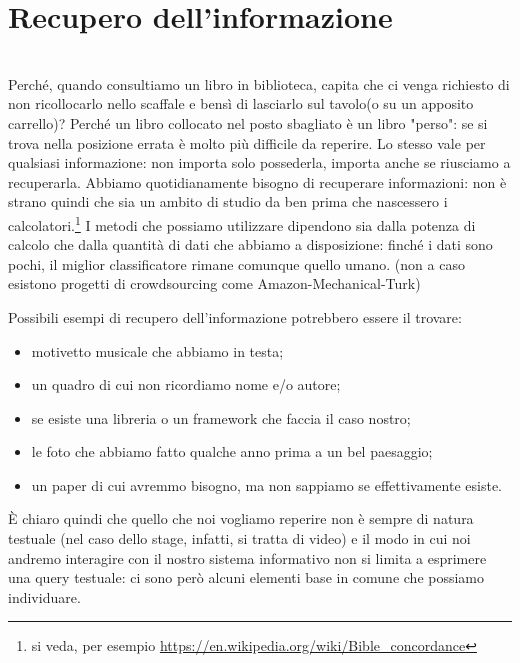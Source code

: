 \chapter{Recupero dell'informazione}
\label{cap:recupero-informazione}
\\

Perché, quando consultiamo un libro in biblioteca, capita che ci venga richiesto di non ricollocarlo nello scaffale e bensì di lasciarlo sul tavolo(o su un apposito carrello)? Perché un libro collocato nel posto sbagliato è un libro "perso": se si trova nella posizione errata è molto più difficile da reperire. Lo stesso vale per qualsiasi informazione: non importa solo possederla, importa anche se riusciamo a recuperarla.
Abbiamo quotidianamente bisogno di recuperare informazioni: non è strano quindi che sia un ambito di studio da ben prima che nascessero i calcolatori.\footnote{si veda, per esempio \url{https://en.wikipedia.org/wiki/Bible_concordance}} I metodi che possiamo utilizzare dipendono sia dalla potenza di calcolo che dalla quantità di dati che abbiamo a disposizione: finché i dati sono pochi, il miglior classificatore rimane comunque quello umano. (non a caso esistono progetti di crowdsourcing come \gls{Amazon-Mechanical-Turk}\glsfirstoccur{})

Possibili esempi di recupero dell'informazione potrebbero essere il trovare: 
\begin{itemize}
\item motivetto musicale che abbiamo in testa;
\item un quadro di cui non ricordiamo nome e/o autore;
\item se esiste una libreria o un framework che faccia il caso nostro;
\item le foto che abbiamo fatto qualche anno prima a un bel paesaggio;
\item un paper di cui avremmo bisogno, ma non sappiamo se effettivamente esiste.
\end{itemize}

È chiaro quindi che quello che noi vogliamo reperire non è sempre di natura testuale (nel caso dello stage, infatti, si tratta di video) e il modo in cui noi andremo interagire con il nostro sistema informativo non si limita a esprimere una query testuale: ci sono però alcuni elementi base in comune che possiamo individuare.

